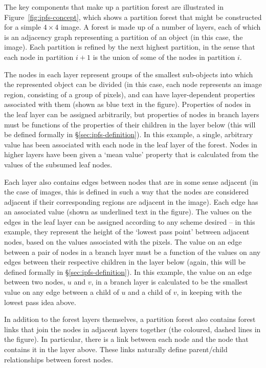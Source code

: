 The key components that make up a partition forest are illustrated in Figure~\ref{fig:ipfs-concept}, which shows a partition forest that might be constructed for a simple $4 \times 4$ image. A forest is made up of a number of layers, each of which is an adjacency graph representing a partition of an object (in this case, the image). Each partition is refined by the next highest partition, in the sense that each node in partition $i+1$ is the union of some of the nodes in partition $i$.

The nodes in each layer represent groups of the smallest sub-objects into which the represented object can be divided (in this case, each node represents an image region, consisting of a group of pixels), and can have layer-dependent properties associated with them (shown as blue text in the figure). Properties of nodes in the leaf layer can be assigned arbitrarily, but properties of nodes in branch layers must be functions of the properties of their children in the layer below (this will be defined formally in \S\ref{sec:ipfs-definition}). In this example, a single, arbitrary value has been associated with each node in the leaf layer of the forest. Nodes in higher layers have been given a `mean value' property that is calculated from the values of the subsumed leaf nodes.

Each layer also contains edges between nodes that are in some sense adjacent (in the case of images, this is defined in such a way that the nodes are considered adjacent if their corresponding regions are adjacent in the image). Each edge has an associated value (shown as underlined text in the figure). The values on the edges in the leaf layer can be assigned according to any scheme desired -- in this example, they represent the height of the `lowest pass point' between adjacent nodes, based on the values associated with the pixels. The value on an edge between a pair of nodes in a branch layer must be a function of the values on any edges between their respective children in the layer below (again, this will be defined formally in \S\ref{sec:ipfs-definition}). In this example, the value on an edge between two nodes, $u$ and $v$, in a branch layer is calculated to be the smallest value on any edge between a child of $u$ and a child of $v$, in keeping with the lowest pass idea above.

In addition to the forest layers themselves, a partition forest also contains forest links that join the nodes in adjacent layers together (the coloured, dashed lines in the figure). In particular, there is a link between each node and the node that contains it in the layer above. These links naturally define parent/child relationships between forest nodes.


